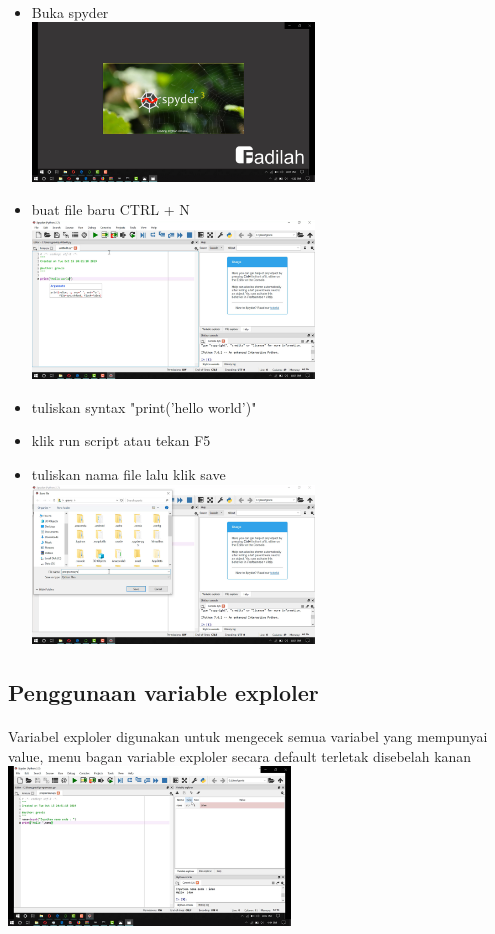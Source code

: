 \documentclass[a4paper,12pt]{report}
\begin{document}
\paragraph{}
\begin{itemize}
	\item Buka spyder\\
	\includegraphics[width=7.5cm]{gambar/spyder/Screenshot (81).png} 
	\item buat file baru CTRL + N\\
	\includegraphics[width=7.5cm]{gambar/spyder/Screenshot (83).png} 
	\item tuliskan syntax "print('hello world')"
	\item klik run script atau tekan F5
	\item tuliskan nama file lalu klik save\\
	\includegraphics[width=7.5cm]{gambar/spyder/Screenshot (84).png} 
\end{itemize}
\subsection{Penggunaan variable exploler}
\paragraph{}
Variabel exploler digunakan untuk mengecek semua variabel yang mempunyai value, menu bagan variable exploler secara default terletak disebelah kanan\\
\includegraphics[width=7.5cm]{gambar/spyder/Screenshot (87).png} 
\end{document}

